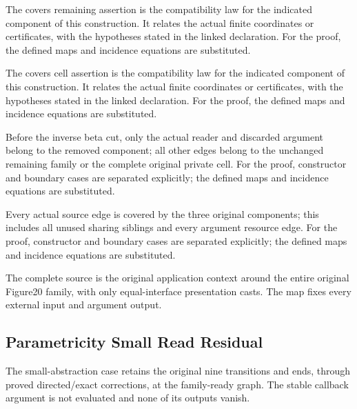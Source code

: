 The covers remaining assertion is the compatibility law for the indicated component of this construction. It relates the actual finite coordinates or certificates, with the hypotheses stated in the linked declaration.
For the proof, the defined maps and incidence equations are substituted.
\par{}

The covers cell assertion is the compatibility law for the indicated component of this construction. It relates the actual finite coordinates or certificates, with the hypotheses stated in the linked declaration.
For the proof, the defined maps and incidence equations are substituted.
\par{}

Before the inverse beta cut, only the actual reader and discarded argument belong to the removed component; all other edges belong to the unchanged remaining family or the complete original private cell.
For the proof, constructor and boundary cases are separated explicitly; the defined maps and incidence equations are substituted.
\par{}

Every actual source edge is covered by the three original components; this includes all unused sharing siblings and every argument resource edge.
For the proof, constructor and boundary cases are separated explicitly; the defined maps and incidence equations are substituted.
\par{}

The complete source is the original application context around the entire original Figure20 family, with only equal-interface presentation casts. The map fixes every external input and argument output.
\par{}

\subsection{Parametricity Small Read Residual}
The small-abstraction case retains the original nine transitions and ends, through proved directed/exact corrections, at the family-ready graph. The stable callback argument is not evaluated and none of its outputs vanish.

